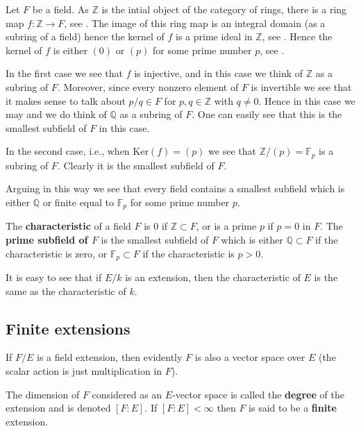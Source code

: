 Let $F$ be a field. As $\mathbb{Z}$ is the intial object of the category of
rings, there is a ring map $f : \mathbb{Z} \to F$, see
.
The image of this ring map is an integral domain (as a subring of a field)
hence the kernel of $f$ is a prime ideal in $\mathbb{Z}$, see
.
Hence the kernel of $f$ is either $(0)$ or $(p)$ for some prime number $p$, see
.

In the first case we see that $f$ is injective, and in this case
we think of $\mathbb{Z}$ as a subring of $F$. Moreover, since every
nonzero element of $F$ is invertible we see that it makes sense to
talk about $p/q \in F$ for $p, q \in \mathbb{Z}$ with $q \not = 0$.
Hence in this case we may and we do think of $\mathbb{Q}$ as a subring of $F$.
One can easily see that this is the smallest subfield of $F$ in this case.

In the second case, i.e., when $\text{Ker}(f) = (p)$ we see that
$\mathbb{Z}/(p) = \mathbb{F}_p$ is a subring of $F$.  Clearly it is the smallest subfield of $F$.

Arguing in this way we see that every field contains a smallest subfield
which is either $\mathbb{Q}$ or finite equal to $\mathbb{F}_p$ for some
prime number $p$.

\begin{definition}
The \textbf{characteristic} of a field $F$ is $0$ if
$\mathbb{Z} \subset F$, or is a prime $p$ if $p = 0$ in $F$.
The \textbf{prime subfield of $F$} is the smallest subfield of $F$
which is either $\mathbb{Q} \subset F$ if the characteristic is zero, or
$\mathbb{F}_p \subset F$ if the characteristic is $p > 0$.
\end{definition}


It is easy to see that if $E/k$ is an extension, then the characteristic of
$E$ is the same as the characteristic of $k$. 

\subsection{Finite extensions}
If
$F/E$ is a field extension,  then evidently  $F$ is also a vector space over $E$
(the scalar action is just multiplication in $F$). 

\begin{definition} 
The dimension of $F$
considered as an $E$-vector space is called the \textbf{degree} of the extension and is
denoted $[F:E]$. If $[F:E]<\infty$ then $F$ is said to be a
\textbf{finite} extension.
\end{definition} 

